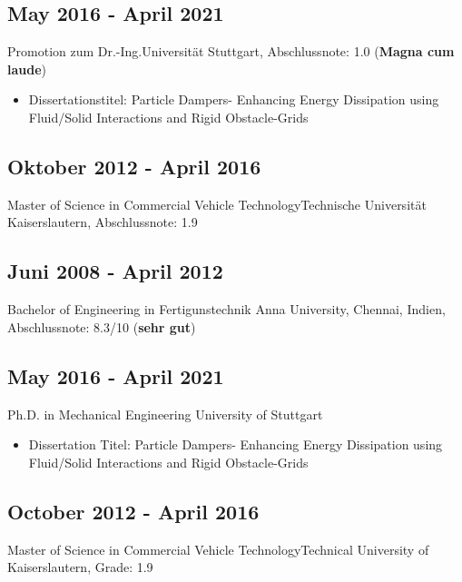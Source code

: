 \documentclass{mycv}
\begin{document}
\begin{paracol}{2}
\switchcolumn
{}
{
        \subsection{May 2016 - April 2021}{Promotion zum
        Dr.-Ing.}{Universit{\"a}t Stuttgart}, {Abschlussnote: 1.0 ({\bfseries Magna cum
        laude})}
          \begin{itemize}
              \item Dissertationstitel: Particle Dampers- Enhancing
                  Energy Dissipation using Fluid/Solid Interactions and Rigid
                  Obstacle-Grids
          \end{itemize}
        
        \subsection{Oktober 2012 - April 2016}{Master of Science in Commercial
        Vehicle Technology}{Technische Universit{\"a}t Kaiserslautern,
        {Abschlussnote: 1.9}}\\
        
        \subsection{Juni 2008 - April 2012}{Bachelor of Engineering in
        Fertigunstechnik} {Anna University, Chennai, Indien, {Abschlussnote:
        8.3/10} ({\bfseries sehr gut})}\\

}
{
        \subsection{May 2016 - April 2021}{Ph.D. in Mechanical Engineering}
        {University of Stuttgart}
          \begin{itemize}
              \item Dissertation Titel: Particle Dampers- Enhancing
                  Energy Dissipation using Fluid/Solid Interactions and Rigid
                  Obstacle-Grids
          \end{itemize}

        \subsection{October 2012 - April 2016}{Master of Science in Commercial Vehicle
        Technology}{Technical University of Kaiserslautern, {Grade: 1.9}}\\

}
\end{paracol}
\end{document}
